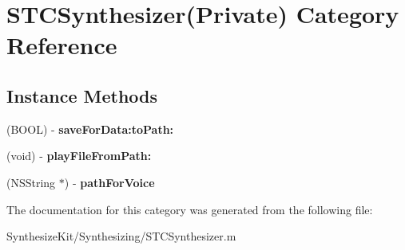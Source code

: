 \hypertarget{category_s_t_c_synthesizer_07_private_08}{}\section{S\+T\+C\+Synthesizer(Private) Category Reference}
\label{category_s_t_c_synthesizer_07_private_08}
\subsection*{Instance Methods}
\begin{DoxyCompactItemize}
\item 
\hypertarget{category_s_t_c_synthesizer_07_private_08_a389b8cae208661fceb3b2172d655d713}{}\label{category_s_t_c_synthesizer_07_private_08_a389b8cae208661fceb3b2172d655d713} 
(B\+O\+OL) -\/ {\bfseries save\+For\+Data\+:to\+Path\+:}
\item 
\hypertarget{category_s_t_c_synthesizer_07_private_08_a994581b4794c8c3436b6800aed06b47f}{}\label{category_s_t_c_synthesizer_07_private_08_a994581b4794c8c3436b6800aed06b47f} 
(void) -\/ {\bfseries play\+File\+From\+Path\+:}
\item 
\hypertarget{category_s_t_c_synthesizer_07_private_08_a5d3e9625c1c03c0b356a9ff96cdb9c70}{}\label{category_s_t_c_synthesizer_07_private_08_a5d3e9625c1c03c0b356a9ff96cdb9c70} 
(N\+S\+String $\ast$) -\/ {\bfseries path\+For\+Voice}
\end{DoxyCompactItemize}


The documentation for this category was generated from the following file\+:\begin{DoxyCompactItemize}
\item 
Synthesize\+Kit/\+Synthesizing/S\+T\+C\+Synthesizer.\+m\end{DoxyCompactItemize}
